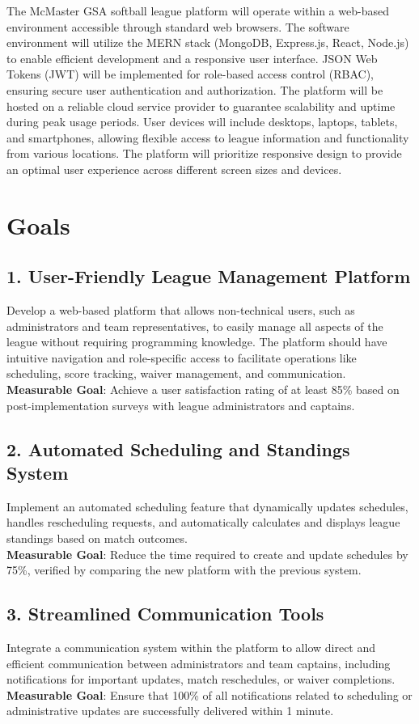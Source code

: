 \documentclass{article}
\begin{document}
The McMaster GSA softball league platform will operate within a web-based environment accessible through standard web browsers. The software environment will utilize the MERN stack (MongoDB, Express.js, React, Node.js) to enable efficient development and a responsive user interface. JSON Web Tokens (JWT) will be implemented for role-based access control (RBAC), ensuring secure user authentication and authorization. The platform will be hosted on a reliable cloud service provider to guarantee scalability and uptime during peak usage periods. User devices will include desktops, laptops, tablets, and smartphones, allowing flexible access to league information and functionality from various locations. The platform will prioritize responsive design to provide an optimal user experience across different screen sizes and devices.
\section{Goals}

\subsection*{1. User-Friendly League Management Platform}
Develop a web-based platform that allows non-technical users, such as administrators and team representatives, to easily manage all aspects of the league without requiring programming knowledge. The platform should have intuitive navigation and role-specific access to facilitate operations like scheduling, score tracking, waiver management, and communication. \\
\textbf{Measurable Goal}: Achieve a user satisfaction rating of at least 85\% based on post-implementation surveys with league administrators and captains.

\subsection*{2. Automated Scheduling and Standings System}
Implement an automated scheduling feature that dynamically updates schedules, handles rescheduling requests, and automatically calculates and displays league standings based on match outcomes. \\
\textbf{Measurable Goal}: Reduce the time required to create and update schedules by 75\%, verified by comparing the new platform with the previous system.

\subsection*{3. Streamlined Communication Tools}
Integrate a communication system within the platform to allow direct and efficient communication between administrators and team captains, including notifications for important updates, match reschedules, or waiver completions. \\
\textbf{Measurable Goal}: Ensure that 100\% of all notifications related to scheduling or administrative updates are successfully delivered within 1 minute.
\end{document}
